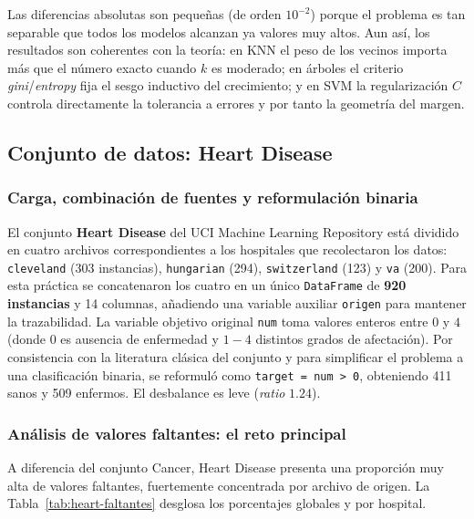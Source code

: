 Las diferencias absolutas son pequeñas (de orden $10^{-2}$) porque el
problema es tan separable que todos los modelos alcanzan ya valores muy
altos. Aun así, los resultados son coherentes con la teoría: en KNN el
peso de los vecinos importa más que el número exacto cuando $k$ es
moderado; en árboles el criterio \textit{gini}/\textit{entropy} fija el
sesgo inductivo del crecimiento; y en SVM la regularización $C$ controla
directamente la tolerancia a errores y por tanto la geometría del
margen.

\subsection{Conjunto de datos: Heart Disease}

\subsubsection*{Carga, combinación de fuentes y reformulación binaria}

El conjunto \textbf{Heart Disease} del UCI Machine Learning Repository
está dividido en cuatro archivos correspondientes a los hospitales que
recolectaron los datos: \texttt{cleveland} (303 instancias),
\texttt{hungarian} (294), \texttt{switzerland} (123) y \texttt{va} (200).
Para esta práctica se concatenaron los cuatro en un único
\texttt{DataFrame} de \textbf{920 instancias} y 14 columnas, añadiendo
una variable auxiliar \texttt{origen} para mantener la trazabilidad. La
variable objetivo original \texttt{num} toma valores enteros entre $0$ y
$4$ (donde $0$ es ausencia de enfermedad y $1\!-\!4$ distintos grados de
afectación). Por consistencia con la literatura clásica del conjunto y
para simplificar el problema a una clasificación binaria, se reformuló
como \texttt{target = num > 0}, obteniendo 411 sanos y 509 enfermos. El
desbalance es leve (\textit{ratio} $1.24$).

\subsubsection*{Análisis de valores faltantes: el reto principal}

A diferencia del conjunto Cancer, Heart Disease presenta una proporción
muy alta de valores faltantes, fuertemente concentrada por archivo de
origen. La Tabla~\ref{tab:heart-faltantes} desglosa los porcentajes
globales y por hospital.

